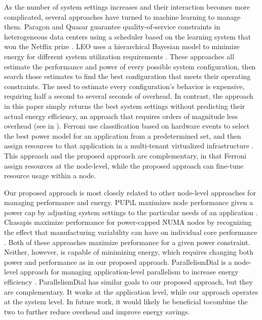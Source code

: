 As the number of system settings increases and their interaction becomes more complicated, several approaches have turned to machine learning to manage them.
Paragon \cite{Paragon} and Quasar \cite{quasar} guarantee quality-of-service constraints in heterogeneous data centers using a scheduler based on the learning system that won the Netflix prize \cite{NetflixPrize}.
LEO uses a hierarchical Bayesian model to minimize energy for different system utilization requirements \cite{LEO}.
These approaches all estimate the performance and power of every possible system configuration, then search those estimates to find the best configuration that meets their operating constraints.
The need to estimate every configuration's behavior is expensive, requiring half a second \cite{LEO} to several seconds \cite{Paragon} of overhead.
In contrast, the approach in this paper simply returns the best system settings without predicting their actual energy efficiency, an approach that requires orders of magnitude less overhead (see  in ).
Ferroni \etal use classification based on hardware events to select the best power model for an application from a predetermined set, and then assign resources to that application in a multi-tenant virtualized infrastructure \cite{FerroniTACO}.
This approach and the proposed approach are complementary, in that Ferroni \etal assign resources at the node-level, while the proposed approach can fine-tune resource usage within a node.

Our proposed approach is most closely related to other node-level approaches for managing performance and energy.
PUPiL maximizes node performance given a power cap by adjusting system settings to the particular needs of an application \cite{pupil}.
Chasapis \etal maximize performance for power-capped NUMA nodes by recognizing the effect that manufacturing variability can have on individual core performance \cite{Chasapis2016}.
Both of these approaches maximize performance for a given power constraint.
Neither, however, is capable of minimizing energy, which requires changing both power and performance as in our proposed approach.
ParallelismDial is a node-level approach for managing application-level parallelism to increase energy efficiency \cite{Sridharan2013}.
ParallelismDial has similar goals to our proposed approach, but they are complementary.
It works at the application level, while our approach operates at the system level.
In future work, it would likely be beneficial tocombine the two to further reduce overhead and improve energy savings.
